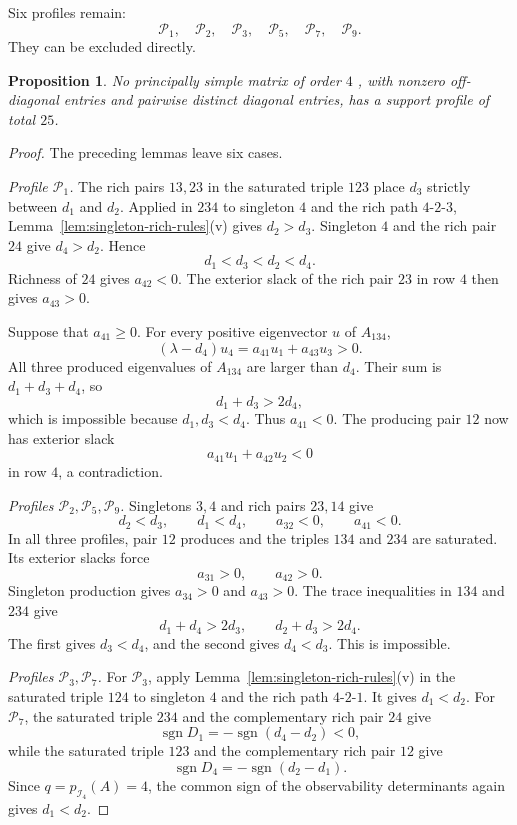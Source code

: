 \documentclass[11pt,a4paper]{article}
\newtheorem{proposition}[theorem]{Proposition}
\theoremstyle{definition}
\newcommand{\Ind}{\mathcal I}
\DeclareMathOperator{\sgn}{sgn}
\begin{document}
Six profiles remain:
$$
\mathcal P_1,\quad
\mathcal P_2,\quad
\mathcal P_3,\quad
\mathcal P_5,\quad
\mathcal P_7,\quad
\mathcal P_9.
$$
They can be excluded directly.

\begin{proposition}
\label{prop:no-total-25}
No principally simple matrix of order $4$ , with nonzero off-diagonal
entries and pairwise distinct diagonal entries, has a support profile
of total $25$.
\end{proposition}

\begin{proof}
The preceding lemmas leave six cases.

\smallskip
\noindent\emph{Profile $\mathcal P_1$.}
The rich pairs $13,23$ in the saturated triple $123$ place $d_3$
strictly between $d_1$ and $d_2$. Applied in $234$ to singleton $4$
and the rich path $4$-$2$-$3$,
Lemma~\ref{lem:singleton-rich-rules}\textup{(v)} gives $d_2>d_3$.
Singleton $4$ and the rich pair $24$ give $d_4>d_2$. Hence
$$
d_1<d_3<d_2<d_4.
$$
Richness of $24$ gives $a_{42}<0$. The exterior slack of the rich pair
$23$ in row $4$ then gives $a_{43}>0$.

Suppose that $a_{41}\geq0$. For every positive eigenvector $u$ of
$A_{134}$,
$$
(\lambda-d_4)u_4
=
a_{41}u_1+a_{43}u_3
>0.
$$
All three produced eigenvalues of $A_{134}$ are larger than $d_4$.
Their sum is $d_1+d_3+d_4$, so
$$
d_1+d_3>2d_4,
$$
which is impossible because $d_1,d_3<d_4$. Thus $a_{41}<0$. The
producing pair $12$ now has exterior slack
$$
a_{41}u_1+a_{42}u_2<0
$$
in row $4$, a contradiction.

\smallskip
\noindent\emph{Profiles $\mathcal P_2,\mathcal P_5,\mathcal P_9$.}
Singletons $3,4$ and rich pairs $23,14$ give
$$
d_2<d_3,
\qquad
d_1<d_4,
\qquad
a_{32}<0,
\qquad
a_{41}<0.
$$
In all three profiles, pair $12$ produces and the triples $134$ and
$234$ are saturated. Its exterior slacks force
$$
a_{31}>0,
\qquad
a_{42}>0.
$$
Singleton production gives $a_{34}>0$ and $a_{43}>0$. The trace
inequalities in $134$ and $234$ give
$$
d_1+d_4>2d_3,
\qquad
d_2+d_3>2d_4.
$$
The first gives $d_3<d_4$, and the second gives $d_4<d_3$. This is
impossible.

\smallskip
\noindent\emph{Profiles $\mathcal P_3,\mathcal P_7$.}
For $\mathcal P_3$, apply
Lemma~\ref{lem:singleton-rich-rules}\textup{(v)} in the saturated
triple $124$ to singleton $4$ and the rich path
$4$-$2$-$1$. It gives $d_1<d_2$. For $\mathcal P_7$, the saturated
triple $234$ and the complementary rich pair $24$ give
$$
\sgn D_1=-\sgn(d_4-d_2)<0,
$$
while the saturated triple $123$ and the complementary rich pair $12$
give
$$
\sgn D_4=-\sgn(d_2-d_1).
$$
Since $q=p_{\Ind_4}(A)=4$, the common sign of the observability
determinants again gives $d_1<d_2$.


\end{proof}
\end{document}
